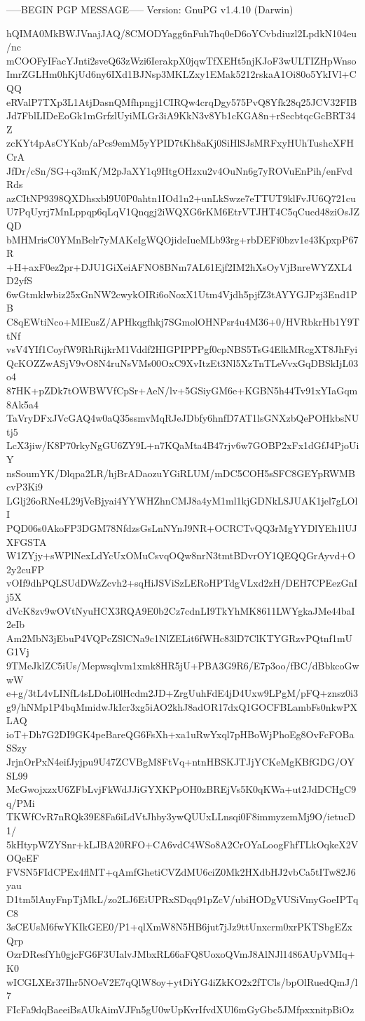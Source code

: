 -----BEGIN PGP MESSAGE-----
Version: GnuPG v1.4.10 (Darwin)

hQIMA0MkBWJVnajJAQ/8CMODYagg6nFuh7hq0eD6oYCvbdiuzl2LpdkN104eu/nc
mCOOFyIFacYJnti2sveQ63zWzi6IerakpX0jqwTfXEHt5njKJoF3wULTIZHpWnso
ImrZGLHm0hKjUd6ny6IXd1BJNsp3MKLZxy1EMak5212rskaA1Oi80o5YkIVl+CQQ
eRValP7TXp3L1AtjDasnQMfhpngj1CIRQw4crqDgy575PvQ8Yfk28q25JCV32FIB
Jd7FblLIDeEoGk1mGrfzlUyiMLGr3iA9KkN3v8Yb1cKGA8n+rSecbtqcGcBRT34Z
zcKYt4pAsCYKnb/aPcs9emM5yYPID7tKh8aKj0SiHlSJsMRFxyHUhTushcXFHCrA
JfDr/cSn/SG+q3mK/M2pJaXY1q9HtgOHzxu2v4OuNn6g7yROVuEnPih/enFvdRds
azCItNP9398QXDhsxbl9U0P0ahtn1IOd1n2+unLkSwze7eTTUT9klFvJU6Q721cu
U7PqUyrj7MnLppqp6qLqV1Qnqgj2iWQXG6rKM6EtrVTJHT4C5qCucd48ziOsJZQD
bMHMrisC0YMnBelr7yMAKeIgWQOjideIueMLb93rg+rbDEFi0bzv1e43KpxpP67R
+H+axF0ez2pr+DJU1GiXeiAFNO8BNm7AL61Ejf2IM2hXsOyVjBnreWYZXL4D2yfS
6wGtmklwbiz25xGnNW2cwykOIRi6oNoxX1Utm4Vjdh5pjfZ3tAYYGJPzj3End1PB
C8qEWtiNco+MIEusZ/APHkqgfhkj7SGmolOHNPsr4u4M36+0/HVRbkrHb1Y9TtNf
vsV4YIf1CoyfW9RhRijkrM1Vddf2HIGPIPPPgf0cpNBS5TsG4ElkMRcgXT8JhFyi
QcKOZZwASjV9vO8N4ruNsVMs00OxC9XvItzEt3Nl5XzTnTLeVvxGqDBSkIjL03o4
87HK+pZDk7tOWBWVfCpSr+AeN/lv+5GSiyGM6e+KGBN5h44Tv91xYIaGqm8Ak5a4
TaVryDFxJVcGAQ4w0aQ35ssmvMqRJeJDbfy6hnfD7AT1lsGNXzbQePOHkbsNUtj5
LcX3jiw/K8P70rkyNgGU6ZY9L+n7KQaMta4B47rjv6w7GOBP2xFx1dGfJ4PjoUiY
nsSoumYK/Dlqpa2LR/hjBrADaozuYGiRLUM/mDC5COH5sSFC8GEYpRWMBcvP3Ki9
LGlj26oRNe4L29jVeBjyai4YYWHZhnCMJ8a4yM1ml1kjGDNkLSJUAK1jel7gLOlI
PQD06s0AkoFP3DGM78NfdzsGsLnNYnJ9NR+OCRCTvQQ3rMgYYDlYEh1lUJXFGSTA
W1ZYjy+sWPlNexLdYcUxOMuCsvqOQw8nrN3tmtBDvrOY1QEQQGrAyvd+O2y2cuFP
vOIf9dhPQLSUdDWzZcvh2+sqHiJSViSzLERoHPTdgVLxd2zH/DEH7CPEezGnIj5X
dVcK8zv9wOVtNyuHCX3RQA9E0b2Cz7cdnLI9TkYhMK8611LWYgkaJMe44baI2eIb
Am2MbN3jEbuP4VQPcZSlCNa9c1NlZELit6fWHc83lD7ClKTYGRzvPQtnf1mUG1Vj
9TMeJklZC5iUs/Mepwsqlvm1xmk8HR5jU+PBA3G9R6/E7p3oo/fBC/dBbkcoGwwW
e+g/3tL4vLINfL4sLDoLi0lHcdm2JD+ZrgUuhFdE4jD4Uxw9LPgM/pFQ+znsz0i3
g9/hNMp1P4bqMmidwJkIcr3xg5iAO2khJ8adOR17dxQ1GOCFBLambFs0nkwPXLAQ
ioT+Dh7G2DI9GK4peBareQG6FsXh+xa1uRwYxql7pHBoWjPhoEg8OvFcFOBaSSzy
JrjnOrPxN4eifJyjpu9U47ZCVBgM8FtVq+ntnHBSKJTJjYCKeMgKBfGDG/OYSL99
McGwojxzxU6ZFbLvjFkWdJJiGYXKPpOH0zBREjVs5K0qKWa+ut2JdDCHgC9q/PMi
TKWfCvR7nRQk39E8Fa6iLdVtJhby3ywQUUxLLnsqi0F8immyzemMj9O/ietucD1/
5kHtypWZYSnr+kLJBA20RFO+CA6vdC4WSo8A2CrOYaLoogFhfTLkOqkeX2VOQeEF
FVSN5FIdCPEx4flMT+qAmfGhetiCVZdMU6ciZ0Mk2HXdbHJ2vbCa5tITw82J6yau
D1tm5lAuyFnpTjMkL/zo2LJ6EiUPRxSDqq91pZcV/ubiHODgVUSiVmyGoeIPTqC8
3sCEUsM6fwYKIkGEE0/P1+qlXmW8N5HB6jut7jJz9ttUnxcrm0xrPKTSbgEZxQrp
OzrDResfYh0gjcFG6F3UIalvJMbxRL66aFQ8UoxoQVmJ8AlNJl1486AUpVMIq+K0
wICGLXEr37Ihr5NOeV2E7qQlW8oy+ytDiYG4iZkKO2x2fTCls/bpOlRuedQmJ/l7
FIcFa9dqBaeeiBsAUkAimVJFn5gU0wUpKvrIfvdXUl6mGyGbc5JMfpxxnitpBiOz
